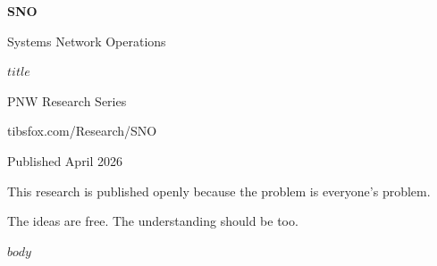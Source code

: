 \documentclass[11pt,a4paper]{article}
\begin{document}
\begin{titlepage}
\centering
\vspace*{3cm}
{\Huge\bfseries\sffamily\color{snoaccent} SNO\par}
\vspace{0.5cm}
{\LARGE\sffamily Systems Network Operations\par}
\vspace{1cm}
{\Large\sffamily\color{snonet} $title$\par}
\vspace{2cm}
{\large\sffamily PNW Research Series\par}
{\normalsize\sffamily tibsfox.com/Research/SNO\par}
\vspace{1cm}
{\normalsize\sffamily\color{snomuted} Published April 2026\par}
\vfill
{\small\sffamily\color{snomuted} This research is published openly because the problem is everyone's problem.\par
The ideas are free. The understanding should be too.\par}
\end{titlepage}

$body$
\end{document}
